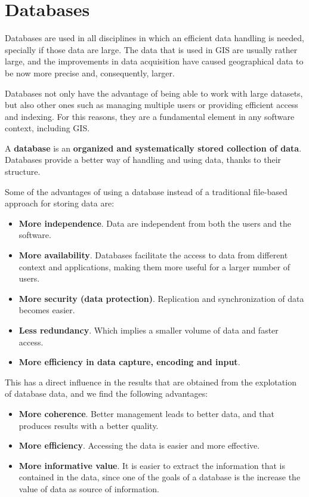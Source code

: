 \chapter{Databases}

\pagestyle{fancy}

Databases are used in all disciplines in which an efficient data handling is needed, specially if those data are large. The data that is used in GIS are usually rather large, and the improvements in data acquisition have caused geographical data to be now more precise and, consequently, larger. 

Databases not only have the advantage of being able to work with large datasets, but also other ones such as managing multiple users or providing efficient access and indexing. For this reasons, they are a fundamental element in any software context, including GIS.

A \textbf{database} is an \textbf{organized and systematically stored collection of data}. Databases provide a better way of handling and using data, thanks to their structure.

Some of the advantages of using a database instead of a traditional file-based approach for storing data are:

\begin{itemize}
	\item \textbf{More independence}. Data are independent from both the users and the software.
	\item \textbf{More availability}. Databases facilitate the access to data from different context and applications, making them more useful for a larger number of users.
	\item \textbf{More security (data protection)}. Replication and synchronization of data becomes easier.
	\item \textbf{Less redundancy}. Which implies a smaller volume of data and faster access.
	\item \textbf{More efficiency in data capture, encoding and input}.
\end{itemize}

This has a direct influence in the results that are obtained from the explotation of database data, and we find the following advantages:

\begin{itemize}
	\item \textbf{More coherence}. Better management leads to better data, and that produces results with a better quality.
	\item \textbf{More efficiency}. Accessing the data is easier and more effective.
	\item \textbf{More informative value}. It is easier to extract the information that is contained in the data, since one of the goals of a database is the increase the value of data as source of information.
\end{itemize}

